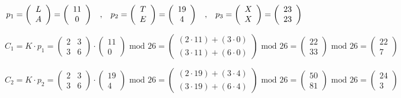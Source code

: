 \[
p_1 = \left(\begin{array}{c} L \\ A \end{array}\right) 
= \left(\begin{array}{c} 11 \\ 0 \end{array}\right)
\hspace{0.3cm},\hspace{0.3cm}
p_2 = \left(\begin{array}{c} T \\ E \end{array}\right) 
= \left(\begin{array}{c} 19 \\ 4 \end{array}\right)
\hspace{0.3cm},\hspace{0.3cm}
p_3 = \left(\begin{array}{c} X \\ X \end{array}\right) 
= \left(\begin{array}{c} 23 \\ 23 \end{array}\right)
\]


\[
C_1 = K \cdot p_1 = \begin{pmatrix} 2 & 3 \\ 3 & 6 \end{pmatrix} \cdot \begin{pmatrix} 11 \\ 0
\end{pmatrix} \text{ mod } 26 = \begin{pmatrix} (2 \cdot 11) + (3 \cdot 0) \\ (3 \cdot 11) +
(6 \cdot 0) \end{pmatrix} \text{ mod } 26 = \begin{pmatrix} 22 \\ 33 \end{pmatrix}
\text{ mod } 26 = \boxed{\begin{pmatrix} 22 \\ 7 \end{pmatrix}}
\]

\[
C_2 = K \cdot p_2 = \begin{pmatrix} 2 & 3 \\ 3 & 6 \end{pmatrix} \cdot \begin{pmatrix} 19 \\ 4
\end{pmatrix} \text{ mod } 26 = \begin{pmatrix} (2 \cdot 19) + (3 \cdot 4) \\ (3 \cdot 19) +
(6 \cdot 4) \end{pmatrix} \text{ mod } 26 = \begin{pmatrix} 50 \\ 81 \end{pmatrix}
\text{ mod } 26 = \boxed{\begin{pmatrix} 24 \\ 3 \end{pmatrix}}
\]

